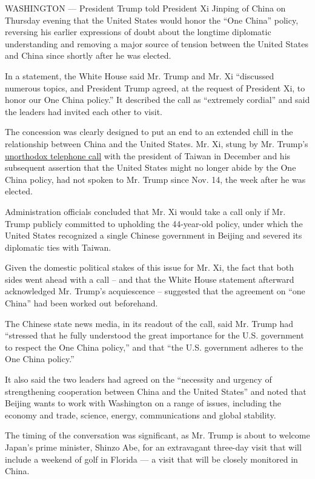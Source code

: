 WASHINGTON --- President Trump told President Xi Jinping of China on
Thursday evening that the United States would honor the ``One China''
policy, reversing his earlier expressions of doubt about the longtime
diplomatic understanding and removing a major source of tension between
the United States and China since shortly after he was elected.

In a statement, the White House said Mr. Trump and Mr. Xi ``discussed
numerous topics, and President Trump agreed, at the request of President
Xi, to honor our One China policy.'' It described the call as
``extremely cordial'' and said the leaders had invited each other to
visit.

The concession was clearly designed to put an end to an extended chill
in the relationship between China and the United States. Mr. Xi, stung
by Mr. Trump's
\href{https://www.nytimes.com/2016/12/02/us/politics/trump-speaks-with-taiwans-leader-a-possible-affront-to-china.html}{unorthodox
telephone call} with the president of Taiwan in December and his
subsequent assertion that the United States might no longer abide by the
One China policy, had not spoken to Mr. Trump since Nov. 14, the week
after he was elected.

Administration officials concluded that Mr. Xi would take a call only if
Mr. Trump publicly committed to upholding the 44-year-old policy, under
which the United States recognized a single Chinese government in
Beijing and severed its diplomatic ties with Taiwan.

Given the domestic political stakes of this issue for Mr. Xi, the fact
that both sides went ahead with a call -- and that the White House
statement afterward acknowledged Mr. Trump's acquiescence -- suggested
that the agreement on ``one China'' had been worked out beforehand.

The Chinese state news media, in its readout of the call, said Mr. Trump
had ``stressed that he fully understood the great importance for the
U.S. government to respect the One China policy,'' and that ``the U.S.
government adheres to the One China policy.''

It also said the two leaders had agreed on the ``necessity and urgency
of strengthening cooperation between China and the United States'' and
noted that Beijing wants to work with Washington on a range of issues,
including the economy and trade, science, energy, communications and
global stability.

The timing of the conversation was significant, as Mr. Trump is about to
welcome Japan's prime minister, Shinzo Abe, for an extravagant three-day
visit that will include a weekend of golf in Florida --- a visit that
will be closely monitored in China.

